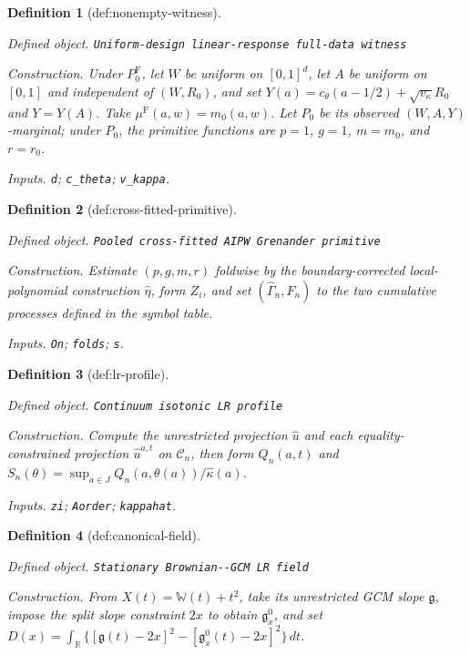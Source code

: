 \documentclass{article}
\newtheorem{definition}{Definition}
\begin{document}
\begin{definition}[def:nonempty-witness]\label{def:nonempty-witness}
\par\smallskip\noindent\emph{Defined object.} \texttt{Uniform-\allowbreak{}design linear-\allowbreak{}response full-\allowbreak{}data witness}
\par\smallskip\noindent\emph{Construction.} Under \(P_0^{\mathrm F}\), let \(W\) be uniform on \([0,1]^d\), let \(A\) be uniform on \([0,1]\) and independent of \((W,R_0)\), and set \(Y(a)=c_{\theta}(a-1/2)+\sqrt{v_{\kappa}}R_0\) and \(Y=Y(A)\). Take \(\mu^{\mathrm F}(a,w)=m_0(a,w)\). Let \(P_0\) be its observed \((W,A,Y)\)-marginal; under \(P_0\), the primitive functions are \(p=1\), \(g=1\), \(m=m_0\), and \(r=r_0\).
\par\smallskip\noindent\emph{Inputs.} \texttt{d}; \texttt{c\_\allowbreak{}theta}; \texttt{v\_\allowbreak{}kappa}.
\end{definition}

\begin{definition}[def:cross-fitted-primitive]\label{def:cross-fitted-primitive}
\par\smallskip\noindent\emph{Defined object.} \texttt{Pooled cross-\allowbreak{}fitted AIPW Grenander primitive}
\par\smallskip\noindent\emph{Construction.} Estimate \((p,g,m,r)\) foldwise by the boundary-corrected local-polynomial construction \(\widehat\eta\), form \(Z_i\), and set \((\widehat\Gamma_n,F_n)\) to the two cumulative processes defined in the symbol table.
\par\smallskip\noindent\emph{Inputs.} \texttt{On}; \texttt{folds}; \texttt{s}.
\end{definition}

\begin{definition}[def:lr-profile]\label{def:lr-profile}
\par\smallskip\noindent\emph{Defined object.} \texttt{Continuum isotonic LR profile}
\par\smallskip\noindent\emph{Construction.} Compute the unrestricted projection \(\widehat u\) and each equality-constrained projection \(\widehat u^{a,t}\) on \(\mathcal C_n\), then form \(Q_n(a,t)\) and \(S_n(\theta)=\sup_{a\in J}Q_n(a,\theta(a))/\widehat\kappa(a)\).
\par\smallskip\noindent\emph{Inputs.} \texttt{zi}; \texttt{Aorder}; \texttt{kappahat}.
\end{definition}

\begin{definition}[def:canonical-field]\label{def:canonical-field}
\par\smallskip\noindent\emph{Defined object.} \texttt{Stationary Brownian-\allowbreak{}-\allowbreak{}GCM LR field}
\par\smallskip\noindent\emph{Construction.} From \(X(t)=\mathbb W(t)+t^2\), take its unrestricted GCM slope \(\mathfrak g\), impose the split slope constraint \(2x\) to obtain \(\mathfrak g_x^0\), and set \(D(x)=\int_{\mathbb R}\{[\mathfrak g(t)-2x]^2-[\mathfrak g_x^0(t)-2x]^2\}\,dt\).
\end{definition}
\end{document}
